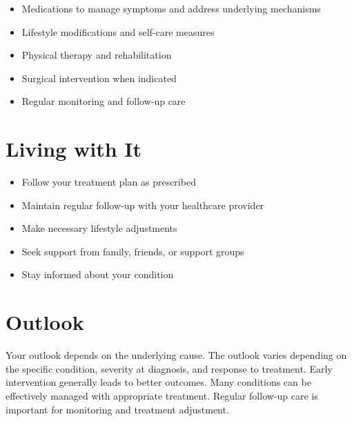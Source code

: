 \begin{itemize}[noitemsep]
  \item Medications to manage symptoms and address underlying mechanisms
  \item Lifestyle modifications and self-care measures
  \item Physical therapy and rehabilitation
  \item Surgical intervention when indicated
  \item Regular monitoring and follow-up care
\end{itemize}
\section{Living with It}
\begin{itemize}[noitemsep]
  \item Follow your treatment plan as prescribed
  \item Maintain regular follow-up with your healthcare provider
  \item Make necessary lifestyle adjustments
  \item Seek support from family, friends, or support groups
  \item Stay informed about your condition
\end{itemize}
\section{Outlook}
Your outlook depends on the underlying cause. The outlook varies depending on the specific condition, severity at diagnosis, and response to treatment. Early intervention generally leads to better outcomes. Many conditions can be effectively managed with appropriate treatment. Regular follow-up care is important for monitoring and treatment adjustment.
